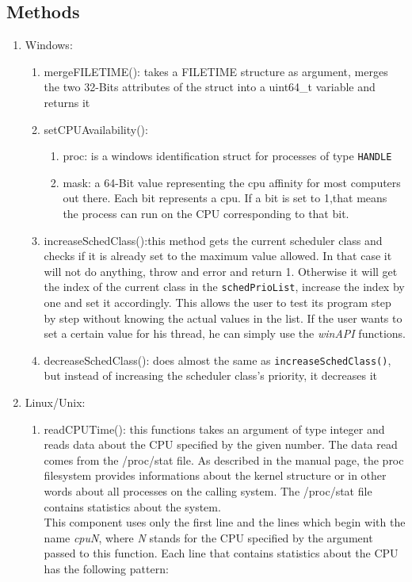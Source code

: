 \subsection{Methods}
\label{system-methods}
\begin{enumerate}
	\item Windows:
	\begin{enumerate}
		\item mergeFILETIME(): takes a FILETIME structure as argument, merges the two 32-Bits attributes of the struct into a uint64\_t variable and returns it
		\item setCPUAvailability():
		\begin{enumerate}
			\item proc: is a windows identification struct for processes of type \texttt{HANDLE}
			\item mask: a 64-Bit value representing the cpu affinity for most computers out there. Each bit represents a cpu. If a bit is set to 1,that means the process can run on the CPU corresponding to that bit.
		\end{enumerate}
		\item increaseSchedClass():this method gets the current scheduler class and checks if it is already set to the maximum value allowed. In that case it will not do anything, throw and error and return 1. Otherwise it will get the index of the current class in the \texttt{schedPrioList}, increase the index by one and set it accordingly. This allows the user to test its program step by step without knowing the actual values in the list. If the user wants to set a certain value for his thread, he can simply use the \textit{winAPI} functions.
		\item decreaseSchedClass(): does almost the same as \texttt{increaseSchedClass()}, but instead of increasing the scheduler class's priority, it decreases it
	\end{enumerate}
	\item Linux/Unix:
	\begin{enumerate}
		\item readCPUTime(): this functions takes an argument of type integer and reads data about the CPU specified by the given number. The data read comes from the \dq/proc/stat\dq{} file. As described in the manual page, the proc filesystem provides informations about the kernel structure or in other words about all processes on the calling system. The \dq/proc/stat\dq{} file contains statistics about the system.\\
		This component uses only the first line and the lines which begin with the name \textit{cpuN}, where \textit{N} stands for the CPU specified by the argument passed to this function. Each line that contains statistics about the CPU has the following pattern\cite{linux-man-proc}:\\\\\vspace{1cm}

\end{enumerate}
\end{enumerate}
